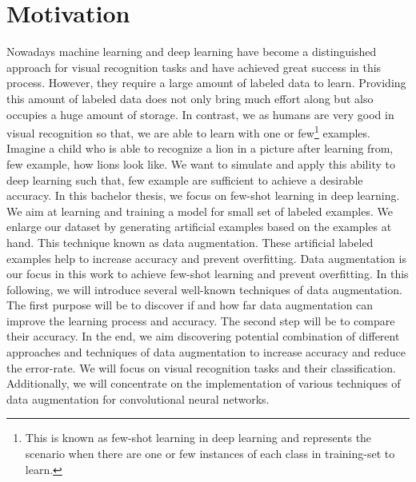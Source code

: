 \chapter{Motivation}
Nowadays machine learning and deep learning have become a distinguished approach for visual
recognition tasks and have achieved great success in this process. However, they require a large amount of
labeled data to learn. Providing this amount of labeled data does not only bring much effort along
but also occupies a huge amount of storage. In
contrast, we as humans are very good in visual recognition so that, we are able to learn with one or few\footnote{This is known as few-shot learning in
  deep learning and represents the scenario when there are one or few instances of each class in
  training-set to learn.}
examples. Imagine a child who is able to recognize a lion in a picture
after learning from, few example, how lions look like. We want to simulate and apply this ability to deep learning
such that, few example are sufficient to achieve a desirable accuracy.
In this bachelor thesis, we focus on few-shot learning in deep learning. We aim at
learning and training a model for small set of labeled examples. We enlarge our dataset by
generating artificial examples based on the examples at hand. This technique known as data
augmentation. These artificial labeled examples help to increase accuracy and prevent overfitting. Data augmentation is our focus in this work to achieve few-shot
learning and prevent overfitting. In this following, we will introduce several well-known techniques
of data augmentation. The first purpose will be to discover if and how far data augmentation can
improve the learning process and accuracy. The second step will be to compare their accuracy. In
the end, we aim discovering potential combination of different approaches and techniques of data
augmentation to increase accuracy and reduce the error-rate.
We will focus on visual recognition tasks and their classification. Additionally, we will
concentrate on the implementation of various techniques of data augmentation for convolutional
neural networks.


